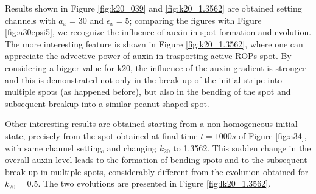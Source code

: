 Results shown in Figure \ref{fig:k20_039} and \ref{fig:k20_1.3562} are obtained setting channels with $a_x = 30$ and $\epsilon_x = 5$; comparing the figures with Figure \ref{fig:a30epsi5}, we recognize the influence of auxin in spot formation and evolution. The more interesting feature is shown in Figure \ref{fig:k20_1.3562}, where one can appreciate the advective power of auxin in trasporting active ROPs spot. By considering a bigger value for k20, the influence of the auxin gradient is stronger and this is demonstrated not only in the break-up of the initial stripe into multiple spots (as happened before), but also in the bending of the spot and subsequent breakup into a similar peanut-shaped spot.

Other interesting results are obtained starting from a non-homogeneous initial state, precisely from the spot obtained at final time $t = 1000s$ of Figure \ref{fig:a34}, with same channel setting, and changing $k_{20}$ to 1.3562. This sudden change in the overall auxin level leads to the formation of bending spots and to the subsequent break-up in multiple spots, considerably different from the evolution obtained for $k_{20} = 0.5$. The two evolutions are presented in Figure \ref{fig:lk20_1.3562}.



